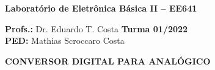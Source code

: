 \documentclass[addpoints]{exam}
\begin{document}
 
\large

\begin{center}
\Large
\textbf{Laboratório de Eletrônica Básica II – EE641}
\end{center}

\large
\vspace{2mm}

\noindent\textbf{Profs.:} Dr. Eduardo T. Costa \hfill \textbf{Turma 01/2022} \\
\textbf{PED:} Mathias Scroccaro Costa \hfill %

\normalsize
 
\vspace{5mm}
 

 
\noindent{}
\hfill
{}

\vspace{5mm}

\noindent{}
\hfill
{}

\vspace{5mm}

\noindent{}
\hfill
{}



\vspace{2mm}


\begin{center}
\large
\textbf{CONVERSOR DIGITAL PARA ANALÓGICO}
\normalsize
\end{center}
\end{document}
